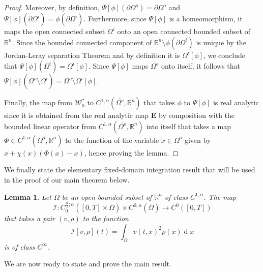 \documentclass[11pt,reqno,a4paper]{amsart}
\theoremstyle{plain}
\newtheorem{lemma}[theorem]{Lemma}
\theoremstyle{definition}
\newcommand{\R}{\mathbb{R}}
\renewcommand{\d}[1]{\ensuremath{\operatorname{d}\!{#1}}}
\begin{document}
\begin{proof}
    Moreover, by definition, $\Psi[\phi]( \partial \Omega^o) = \partial\Omega^o$ and $\Psi[\phi]( \partial \Omega^i) = \phi(\partial\Omega^i)$. Furthermore, since $\Psi[\phi]$ is a homeomorphism, it maps the open connected subset $\Omega^i$ onto an open connected bounded subset of $\mathbb R^n$. Since the bounded connected component of $\mathbb R^n\setminus \phi(\partial\Omega^i)$ is unique by the Jordan-Leray separation Theorem and by definition it is $\Omega^i[\phi]$, we conclude that $\Psi[\phi](\Omega^i) = \Omega^i[\phi]$. Since $\Psi[\phi]$ maps $\overline{\Omega^o}$ onto itself, it follows that $
    \Psi[\phi](\Omega^o\setminus\overline{\Omega^i})=\Omega^o\setminus\overline{\Omega^i[\phi]}$.
    
    Finally, the map from $\mathcal{W}^\ast_0$ to $C^{1,\alpha}(\overline{\Omega^o}, \mathbb{R}^n)$ that takes $\phi$ to $\Psi[\phi]$ is real analytic since it is obtained from the real analytic map $\mathbf{E}$ by composition with the bounded linear operator from $C^{1,\alpha}(\overline{\Omega^o}, \mathbb{R}^n)$ into itself that takes a map $\Phi \in C^{1,\alpha}(\overline{\Omega^o}, \mathbb{R}^n)$ to the function of the variable $x \in \overline{\Omega^o}$ given by $x + \chi(x)(\Phi(x) - x)$, hence proving the lemma.
\end{proof}

We finally state the elementary fixed-domain integration result that will be used in the proof of our main theorem below. 

\begin{lemma}\label{lemma integral regularity}
    Let $\Omega$ be an open bounded subset of $\R^n$ of class $C^{1,\alpha}$. The map
    \[
    \mathcal{I} \colon C_0^{\frac{\alpha}{2}; \alpha}([0, T] \times \overline{\Omega}) \times C^{0, \alpha}(\overline{\Omega}) \longrightarrow C^{0}([0,T])
    \]
    that takes a pair $(v,\rho)$ to the function
    \[
    \mathcal{I}[v,\rho](t)=\int_\Omega v(t,x)^2\rho(x) \d x
    \]
    is of class $C^\infty$.
\end{lemma}

We are now ready to state and prove the main result.
\end{document}
